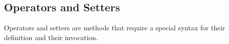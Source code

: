 \begin{comment}
The principle it to produce a strict order of the redefinitions of a method (the linearization).
Each call to @super@ call the next method definition in the linearization.
From a technical point of view, the linearization algorithm used is based on C4.
It ensures that:
\begin{itemize}
\item A definition comes after its redefinition.
\item A redefinition in a refinement comes before a redefnition in a
\item The order of the declaration of the superclasses is used as the ultimate deabiguization.
\end{itemize}


\begin{lst}
class A
	fun derp: String do return "A"
end
class B
	super A
	redef fun derp do return "B" + super
end
class C
	super A
	redef fun derp do return "C" + super
end
class D
	super B
	super C
	redef fun derp do return "D" + super
	# Here the linearization order of the class D is DBCA
	# D before B because D specializes B
	# B before A because B specializes A 
	# D before C because D specializes C
	# C before A because C specializes A
	# B before C because in D 'super B' is before 'super C'  
end
var b = new B
print b.derp # outputs "BA"
var d = new D
print d.derp # outputs "DBCA"
\end{lst}
\end{comment}


\subsection{Operators and Setters}\label{operator}

Operators and setters are methods that require a special syntax for their definition and their invocation.

